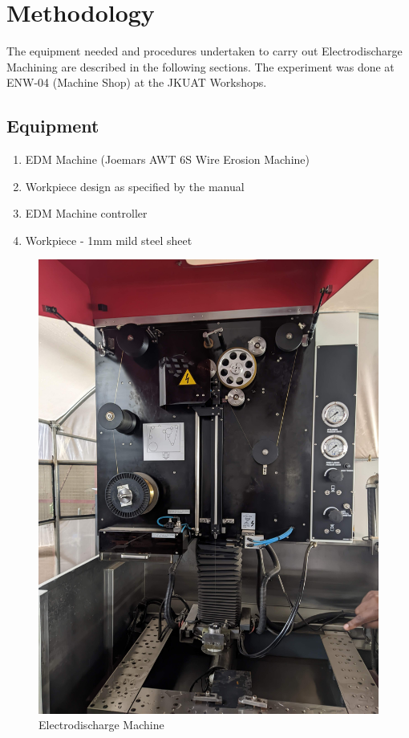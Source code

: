 \section{Methodology}
\lhead{\leftmark}
The equipment needed and procedures undertaken to carry out Electrodischarge Machining are described in the following sections. The experiment was done at ENW-04 (Machine Shop) at the JKUAT Workshops.
\subsection{Equipment}
\begin{enumerate}
\item EDM Machine (Joemars AWT 6S Wire Erosion Machine)
\item Workpiece design as specified by the manual
\item EDM Machine controller 
\item Workpiece - 1mm mild steel sheet
\end{enumerate}
\begin{figure}[h!]
	\centering
	\includegraphics[width=0.7\linewidth]{Figures/edmmachine}
	\caption[EDM Machine]{Electrodischarge Machine}
	\label{fig:scanning}
\end{figure}
